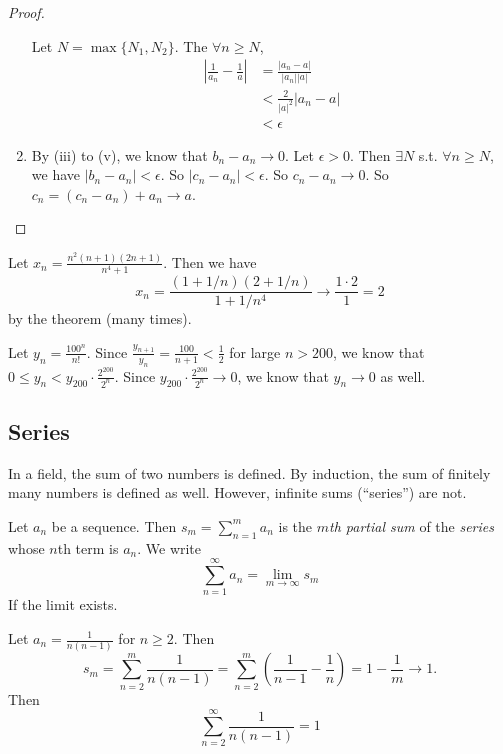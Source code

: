 \documentclass[a4paper]{article}
\begin{document}
\begin{proof}
\begin{enumerate}
        Let $N = \max\{N_1, N_2\}$. The $\forall n \geq N$,
        \begin{align*}
          \left|\frac{1}{a_n} - \frac{1}{a}\right| &= \frac{|a_n - a|}{|a_n||a|}\\
          &< \frac{2}{|a|^2}|a_n - a|\\
          &< \epsilon
        \end{align*}
      \item By (iii) to (v), we know that $b_n - a_n \to 0$. Let $\epsilon > 0$. Then $\exists N$ s.t. $\forall n\geq N$, we have $|b_n - a_n| < \epsilon$. So $|c_n - a_n| < \epsilon$. So $c_n - a_n \to 0$. So $c_n = (c_n - a_n) + a_n \to a$.
    \end{enumerate}
  \end{proof}

  \begin{eg}
    Let $x_n = \frac{n^2(n + 1)(2n + 1)}{n^4 + 1}$. Then we have
    \[
      x_n = \frac{(1 + 1/n)(2 + 1/n)}{1 + 1/n^4}\to \frac{1\cdot 2}{1} = 2
    \]
    by the theorem (many times).
  \end{eg}

  \begin{eg}
    Let $y_n = \frac{100^n}{n!}$. Since $\frac{y_{n + 1}}{y_n} = \frac{100}{n + 1} < \frac{1}{2}$ for large $n > 200$, we know that $0 \leq y_n < y_{200}\cdot \frac{2^{200}}{2^n}$. Since $y_{200}\cdot \frac{2^{200}}{2^n} \to 0$, we know that $y_n\to 0$ as well.
  \end{eg}

  \subsection{Series}
  In a field, the sum of two numbers is defined. By induction, the sum of finitely many numbers is defined as well. However, infinite sums (``series'') are not.

  \begin{defi}
    Let $a_n$ be a sequence. Then $s_m = \sum_{n = 1}^m a_n$ is the \emph{$m$th partial sum} of the \emph{series} whose $n$th term is $a_n$. We write
    \[
      \sum_{n = 1}^\infty a_n = \lim_{m\to \infty} s_m
    \]
    If the limit exists.
  \end{defi}

  \begin{eg}
    Let $a_n = \frac{1}{n(n - 1)}$ for $n\geq 2$. Then 
    \[
      s_m = \sum_{n = 2}^m \frac{1}{n(n - 1)} = \sum_{n = 2}^m\left(\frac{1}{n - 1} - \frac{1}{n}\right) = 1 - \frac{1}{m}\to 1.
    \]
    Then
    \[
      \sum_{n = 2}^\infty \frac{1}{n(n - 1)} = 1
    \]
  \end{eg}
\end{document}
